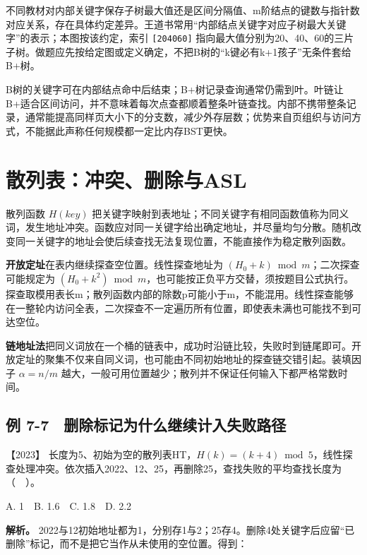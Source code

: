 不同教材对内部关键字保存子树最大值还是区间分隔值、m阶结点的键数与指针数对应关系，存在具体约定差异。王道书常用``内部结点关键字对应子树最大关键字''的表示；本图按该约定，索引 \texttt{{[}20\textbar{}40\textbar{}60{]}} 指向最大值分别为20、40、60的三片子树。做题应先按给定图或定义确定，不把B树的``k键必有k+1孩子''无条件套给B+树。

B树的关键字可在内部结点命中后结束；B+树记录查询通常仍需到叶。叶链让B+适合区间访问，并不意味着每次点查都顺着整条叶链查找。内部不携带整条记录，通常能提高同样页大小下的分支数，减少外存层数；优势来自页组织与访问方式，不能据此声称任何规模都一定比内存BST更快。

\section{散列表：冲突、删除与ASL}\label{ds-07-09}

散列函数 \(H(key)\) 把关键字映射到表地址；不同关键字有相同函数值称为同义词，发生地址冲突。函数应对同一关键字给出确定地址，并尽量均匀分散。随机改变同一关键字的地址会使后续查找无法复现位置，不能直接作为稳定散列函数。

\textbf{开放定址}在表内继续探查空位置。线性探查地址为 \((H_0+k)\bmod m\)；二次探查可能规定为 \((H_0+k^2)\bmod m\)，也可能按正负平方交替，须按题目公式执行。探查取模用表长m；散列函数内部的除数p可能小于m，不能混用。线性探查能够在一整轮内访问全表，二次探查不一定遍历所有位置，即使表未满也可能找不到可达空位。

\textbf{链地址法}把同义词放在一个桶的链表中，成功时沿链比较，失败时到链尾即可。开放定址的聚集不仅来自同义词，也可能由不同初始地址的探查链交错引起。装填因子 \(\alpha=n/m\) 越大，一般可用位置越少；散列并不保证任何输入下都严格常数时间。

\subsection{例 7-7　删除标记为什么继续计入失败路径}\label{ds-ex7-7}

\noindent{}【2023】 长度为5、初始为空的散列表HT，\(H(k)=(k+4)\bmod5\)，线性探查处理冲突。依次插入2022、12、25，再删除25，查找失败的平均查找长度为（　）。

A. 1　B. 1.6　C. 1.8　D. 2.2


\textbf{解析。} 2022与12初始地址都为1，分别存1与2；25存4。删除4处关键字后应留``已删除''标记，而不是把它当作从未使用的空位置。得到：

